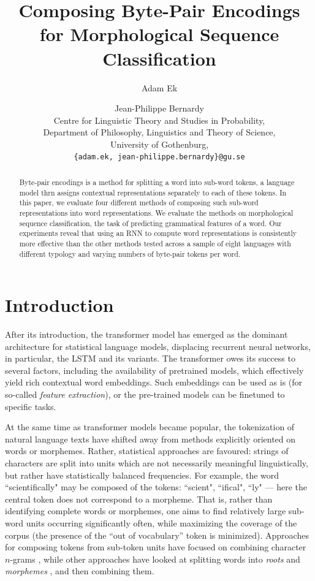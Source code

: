 \documentclass[11pt]{article}
\title{Composing Byte-Pair Encodings for Morphological Sequence Classification}
\author{Adam Ek \and Jean-Philippe Bernardy\\
	Centre for Linguistic Theory and Studies in Probability,\\
	Department of Philosophy, Linguistics and Theory of Science,\\
	University of Gothenburg,\\
	\texttt{\{adam.ek, jean-philippe.bernardy\}@gu.se}}
\date{}
\newcommand\citep{\cite}
\begin{document}
\maketitle
\begin{abstract}
          Byte-pair encodings is a method for splitting a word into
     sub-word tokens, a language model thrn assigns contextual
     representations separately to each of these tokens.  In this
     paper, we evaluate four different methods of composing such
     sub-word representations into word representations. We evaluate
     the methods on morphological sequence classification,
     the task of predicting grammatical features of a word. Our
     experiments reveal that using an RNN to compute word
     representations is consistently more effective than the other
     methods tested across a sample of eight languages with different
     typology and varying numbers of byte-pair tokens per word.
\end{abstract}

	\section{Introduction}
	\label{intro}

            After its introduction, the transformer model
     \citep{vaswani2017attention} has emerged as the dominant
     architecture for statistical language models, displacing
     recurrent neural networks, in particular, the LSTM and its
     variants. The transformer owes its success to several factors,
     including the availability of pretrained models, which
     effectively yield rich contextual word embeddings. Such
     embeddings can be used as is (for so-called \emph{feature extraction}),
     or the pre-trained models can be finetuned to specific
     tasks.

    	At the same time as transformer models became popular, the
     tokenization of natural language texts have shifted away from
     methods explicitly oriented on words or morphemes. Rather,
     statistical approaches are favoured: strings of
     characters are split into units which are not necessarily meaningful
     linguistically, but rather have statistically balanced
     frequencies. For example, the word ``scientifically" may be
     composed of the tokens: ``scient", ``ifical", ``ly" --- here the
     central token does not correspond to a morpheme.
             That is, rather than identifying complete words or
     morphemes, one aims to find relatively large sub-word units
     occurring significantly often, while maximizing the coverage of
     the corpus (the presence of the ``out of vocabulary'' token is
     minimized). Approaches for composing tokens from sub-token units
     have focused on combining character $n$-grams
     \citep{bojanowski2017enriching}, while other approaches have
     looked at splitting words into \textit{roots} and
     \textit{morphemes}
     \citep{el2012orthographic,chaudhary2018adapting,xu2017implicitly},
     and then combining them.
\end{document}
